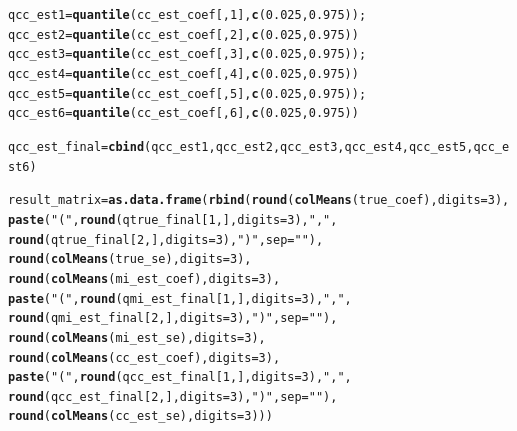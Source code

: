 \documentclass[fleqn,10pt]{wlscirep}\usepackage[]{graphicx}\usepackage[]{color}
\makeatletter
\newcommand{\hlnum}[1]{\textcolor[rgb]{0.686,0.059,0.569}{#1}}%
\newcommand{\hlstr}[1]{\textcolor[rgb]{0.192,0.494,0.8}{#1}}%
\newcommand{\hlstd}[1]{\textcolor[rgb]{0.345,0.345,0.345}{#1}}%
\newcommand{\hlkwb}[1]{\textcolor[rgb]{0.69,0.353,0.396}{#1}}%
\newcommand{\hlkwc}[1]{\textcolor[rgb]{0.333,0.667,0.333}{#1}}%
\newcommand{\hlkwd}[1]{\textcolor[rgb]{0.737,0.353,0.396}{\textbf{#1}}}%
\newenvironment{kframe}{%
 \def\at@end@of@kframe{}%
 \ifinner\ifhmode%
  \def\at@end@of@kframe{\end{minipage}}%
  \begin{minipage}{\columnwidth}%
 \fi\fi%
 \def\FrameCommand##1{\hskip\@totalleftmargin \hskip-\fboxsep
 \colorbox{shadecolor}{##1}\hskip-\fboxsep
     \hskip-\linewidth \hskip-\@totalleftmargin \hskip\columnwidth}%
 \MakeFramed {\advance\hsize-\width
   \@totalleftmargin\z@ \linewidth\hsize
   \@setminipage}}%
 {\par\unskip\endMakeFramed%
 \at@end@of@kframe}
\newenvironment{knitrout}{}{} %
\makeatother
\begin{document}
\begin{knitrout}
\begin{kframe}
\begin{alltt}
  \hlstd{qcc_est1} \hlkwb{=} \hlkwd{quantile}\hlstd{(cc_est_coef[,}\hlnum{1}\hlstd{],} \hlkwd{c}\hlstd{(}\hlnum{0.025}\hlstd{,} \hlnum{0.975}\hlstd{));}
  \hlstd{qcc_est2} \hlkwb{=} \hlkwd{quantile}\hlstd{(cc_est_coef[,}\hlnum{2}\hlstd{],} \hlkwd{c}\hlstd{(}\hlnum{0.025}\hlstd{,} \hlnum{0.975}\hlstd{))}
  \hlstd{qcc_est3} \hlkwb{=} \hlkwd{quantile}\hlstd{(cc_est_coef[,}\hlnum{3}\hlstd{],} \hlkwd{c}\hlstd{(}\hlnum{0.025}\hlstd{,} \hlnum{0.975}\hlstd{));}
  \hlstd{qcc_est4} \hlkwb{=} \hlkwd{quantile}\hlstd{(cc_est_coef[,}\hlnum{4}\hlstd{],} \hlkwd{c}\hlstd{(}\hlnum{0.025}\hlstd{,} \hlnum{0.975}\hlstd{))}
  \hlstd{qcc_est5} \hlkwb{=} \hlkwd{quantile}\hlstd{(cc_est_coef[,}\hlnum{5}\hlstd{],} \hlkwd{c}\hlstd{(}\hlnum{0.025}\hlstd{,} \hlnum{0.975}\hlstd{));}
  \hlstd{qcc_est6} \hlkwb{=} \hlkwd{quantile}\hlstd{(cc_est_coef[,}\hlnum{6}\hlstd{],} \hlkwd{c}\hlstd{(}\hlnum{0.025}\hlstd{,} \hlnum{0.975}\hlstd{))}

  \hlstd{qcc_est_final} \hlkwb{=} \hlkwd{cbind}\hlstd{(qcc_est1, qcc_est2, qcc_est3, qcc_est4, qcc_est5, qcc_est6)}


  \hlstd{result_matrix} \hlkwb{=} \hlkwd{as.data.frame}\hlstd{(}\hlkwd{rbind}\hlstd{(}\hlkwd{round}\hlstd{(}\hlkwd{colMeans}\hlstd{(true_coef),} \hlkwc{digits} \hlstd{=} \hlnum{3}\hlstd{),}
                            \hlkwd{paste}\hlstd{(}\hlstr{"("}\hlstd{,}\hlkwd{round}\hlstd{(qtrue_final[}\hlnum{1}\hlstd{,],} \hlkwc{digits} \hlstd{=} \hlnum{3}\hlstd{),}\hlstr{","}\hlstd{,}
                                  \hlkwd{round}\hlstd{(qtrue_final[}\hlnum{2}\hlstd{,],} \hlkwc{digits} \hlstd{=} \hlnum{3}\hlstd{),}\hlstr{")"}\hlstd{,} \hlkwc{sep} \hlstd{=} \hlstr{""}\hlstd{),}
                                  \hlkwd{round}\hlstd{(}\hlkwd{colMeans}\hlstd{(true_se),} \hlkwc{digits} \hlstd{=} \hlnum{3}\hlstd{),}
                                  \hlkwd{round}\hlstd{(}\hlkwd{colMeans}\hlstd{(mi_est_coef),} \hlkwc{digits} \hlstd{=} \hlnum{3}\hlstd{),}
                            \hlkwd{paste}\hlstd{(}\hlstr{"("}\hlstd{,}\hlkwd{round}\hlstd{(qmi_est_final[}\hlnum{1}\hlstd{,],} \hlkwc{digits} \hlstd{=} \hlnum{3}\hlstd{),}\hlstr{","}\hlstd{,}
                                  \hlkwd{round}\hlstd{(qmi_est_final[}\hlnum{2}\hlstd{,],} \hlkwc{digits} \hlstd{=} \hlnum{3}\hlstd{),}\hlstr{")"}\hlstd{,} \hlkwc{sep} \hlstd{=} \hlstr{""}\hlstd{),}
                                      \hlkwd{round}\hlstd{(}\hlkwd{colMeans}\hlstd{(mi_est_se),} \hlkwc{digits} \hlstd{=} \hlnum{3}\hlstd{),}
                                      \hlkwd{round}\hlstd{(}\hlkwd{colMeans}\hlstd{(cc_est_coef),} \hlkwc{digits} \hlstd{=} \hlnum{3}\hlstd{),}
                            \hlkwd{paste}\hlstd{(}\hlstr{"("}\hlstd{,}\hlkwd{round}\hlstd{(qcc_est_final[}\hlnum{1}\hlstd{,],} \hlkwc{digits} \hlstd{=} \hlnum{3}\hlstd{),}\hlstr{","}\hlstd{,}
                                  \hlkwd{round}\hlstd{(qcc_est_final[}\hlnum{2}\hlstd{,],} \hlkwc{digits} \hlstd{=} \hlnum{3}\hlstd{),}\hlstr{")"}\hlstd{,} \hlkwc{sep} \hlstd{=} \hlstr{""}\hlstd{),}
                                  \hlkwd{round}\hlstd{(}\hlkwd{colMeans}\hlstd{(cc_est_se),} \hlkwc{digits} \hlstd{=} \hlnum{3}\hlstd{)))}


\end{alltt}
\end{kframe}
\end{knitrout}
\end{document}
